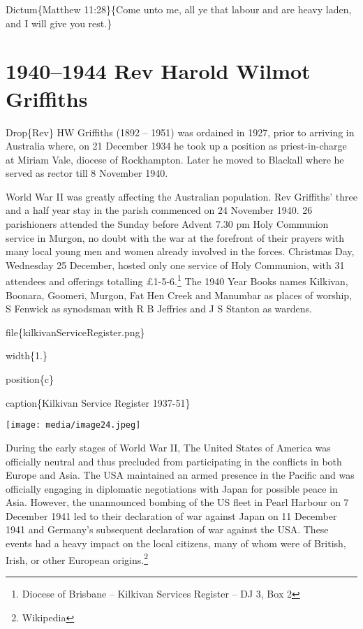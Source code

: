 Dictum\{Matthew 11:28\}\{Come unto me, all ye that labour and are heavy laden, and I will give you rest.\}

\hypertarget{rev-harold-wilmot-griffiths}{%
\chapter{1940--1944 Rev Harold Wilmot Griffiths}\label{rev-harold-wilmot-griffiths}}

Drop\{Rev\} HW Griffiths (1892 -- 1951) was ordained in 1927, prior to arriving in Australia where, on 21 December 1934 he took up a position as priest-in-charge at Miriam Vale, diocese of Rockhampton. Later he moved to Blackall where he served as rector till 8 November 1940.

World War II was greatly affecting the Australian population. Rev Griffiths' three and a half year stay in the parish commenced on 24 November 1940. 26 parishioners attended the Sunday before Advent 7.30 pm Holy Communion service in Murgon, no doubt with the war at the forefront of their prayers with many local young men and women already involved in the forces. Christmas Day, Wednesday 25 December, hosted only one service of Holy Communion, with 31 attendees and offerings totalling £1-5-6.\footnote{Diocese of Brisbane -- Kilkivan Services Register -- DJ 3, Box 2} The 1940 Year Books names Kilkivan, Boonara, Goomeri, Murgon, Fat Hen Creek and Manumbar as places of worship, S Fenwick as synodsman with R B Jeffries and J S Stanton as wardens.

file\{kilkivanServiceRegister.png\}

width\{1.\}

position\{c\}

caption\{Kilkivan Service Register 1937-51\}

\texttt{[image: media/image24.jpeg]}

During the early stages of World War II, The United States of America was officially neutral and thus precluded from participating in the conflicts in both Europe and Asia. The USA maintained an armed presence in the Pacific and was officially engaging in diplomatic negotiations with Japan for possible peace in Asia. However, the unannounced bombing of the US fleet in Pearl Harbour on 7 December 1941 led to their declaration of war against Japan on 11 December 1941 and Germany's subsequent declaration of war against the USA. These events had a heavy impact on the local citizens, many of whom were of British, Irish, or other European origins.\footnote{Wikipedia}

